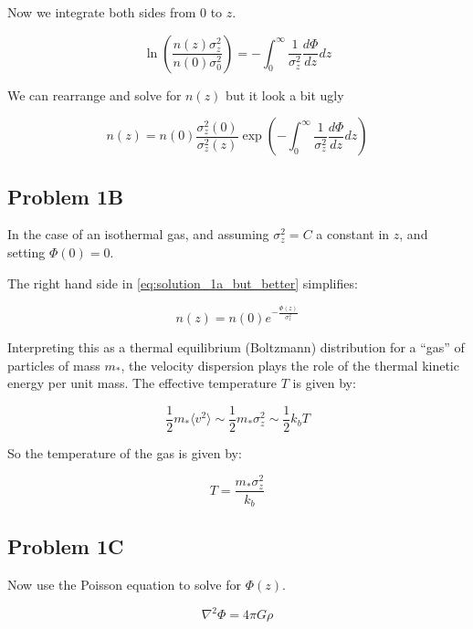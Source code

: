 Now we integrate both sides from $0$ to $z$. 

\begin{equation}\label{eq:solution_1a}
    \boxed{\ln(\frac{n(z)\sigma^2_z}{n(0)\sigma^2_0}) = -\int_0^{\infty} \frac{1}{\sigma^2_z} \frac{d\Phi}{dz} dz}
\end{equation}

We can rearrange and solve for $n(z)$ but it look a bit ugly

\begin{equation}\label{eq:solution_1a_but_better}
    \boxed{n(z) = n(0) \frac{\sigma^2_z(0)}{\sigma^2_z(z)} \exp(-\int_0^{\infty} \frac{1}{\sigma^2_z} \frac{d\Phi}{dz} dz)}
\end{equation}


\subsection*{Problem 1B}
In the case of an isothermal gas, and assuming $\sigma_z^2 = C$ a constant in $z$, and setting $\Phi(0) = 0$. 

The right hand side in \ref{eq:solution_1a_but_better} simplifies:

\begin{equation}
    \boxed{n(z) = n(0) e^{-\frac{\Phi(z)}{\sigma_z^2}}}
\end{equation}


Interpreting this as a thermal equilibrium (Boltzmann) distribution for a ``gas'' of particles of mass  $m_*$, the velocity dispersion plays the role of the thermal kinetic energy per unit mass. The effective temperature $T$ is given by:

\begin{equation}
    \frac{1}{2}m_*\langle v^2\rangle \sim \frac{1}{2}m_*\sigma^2_z \sim \frac{1}{2}k_bT
\end{equation}

So the temperature of the gas is given by:

\begin{equation}
    \boxed{T = \frac{m_* \sigma^2_z}{k_b}}
\end{equation}


\subsection*{Problem 1C}
Now use the Poisson equation to solve for $\Phi(z)$.

\begin{equation}
    \nabla^2 \Phi = 4\pi G \rho
\end{equation}

